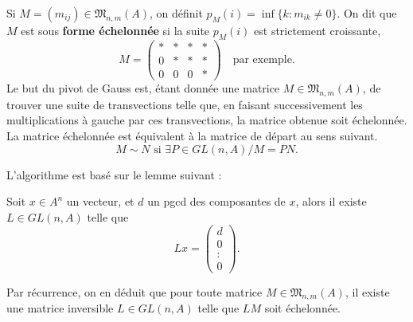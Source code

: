 Si $M=(m_{ij})\in \mathfrak M_{n,m}(A)$, on définit $p_M(i)=\inf\{k : m_{ik}\neq 0\}$. On dit que $M$ est sous \textbf{forme échelonnée} si la suite $p_M(i)$ est strictement croissante, 
\[M=\begin{pmatrix}
* & * & *& *\\
0 & * &*& *\\
0& 0 & 0 & *
\end{pmatrix}\quad \text{par exemple.}\]
Le but du pivot de Gauss est, étant donnée une matrice $M\in \mathfrak M_{n,m}(A)$, de trouver une suite de transvections telle que, en faisant successivement les multiplications à gauche par ces transvections, la matrice obtenue soit échelonnée. La matrice échelonnée est équivalent à la matrice de départ au sens suivant.
\[M\sim N \text{ si }\exists P\in GL(n,A)/ M=PN. \]

L'algorithme est basé sur le lemme suivant :
\begin{lem}
Soit $x\in A^n$ un vecteur, et $d$ un pgcd des composantes de $x$, alors il existe $L\in GL(n,A)$ telle que 
\[Lx=\begin{pmatrix}d \\ 0\\ :\\ 0\end{pmatrix}.\]
\end{lem}

Par récurrence, on en déduit que pour toute matrice $M\in\mathfrak M_{n,m}(A)$, il existe une matrice inversible $L\in GL(n,A)$ telle que $LM$ soit échelonnée.\\

\\
\\



